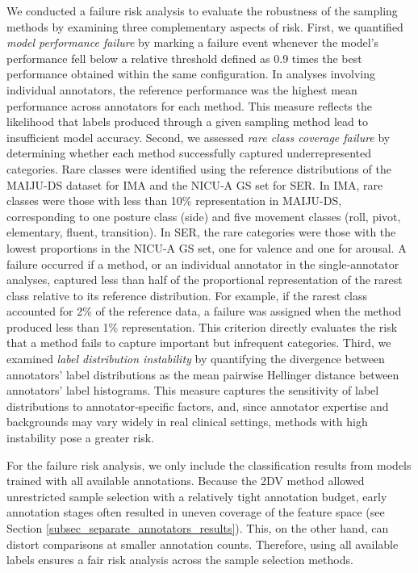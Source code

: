 \documentclass[a4paper,fleqn]{cas-dc}
\begin{document}
We conducted a failure risk analysis to evaluate the robustness of the sampling methods by examining three complementary aspects of risk. First, we quantified \textit{model performance failure} by marking a failure event whenever the model's performance fell below a relative threshold defined as 0.9 times the best performance obtained within the same configuration. In analyses involving individual annotators, the reference performance was the highest mean performance across annotators for each method. This measure reflects the likelihood that labels produced through a given sampling method lead to insufficient model accuracy. Second, we assessed \textit{rare class coverage failure} by determining whether each method successfully captured underrepresented categories. Rare classes were identified using the reference distributions of the MAIJU-DS dataset for IMA and the NICU‑A GS set for SER. In IMA, rare classes were those with less than 10\% representation in MAIJU-DS, corresponding to one posture class (side) and five movement classes (roll, pivot, elementary, fluent, transition). In SER, the rare categories were those with the lowest proportions in the NICU-A GS set, one for valence and one for arousal. A failure occurred if a method, or an individual annotator in the single‑annotator analyses, captured less than half of the proportional representation of the rarest class relative to its reference distribution. For example, if the rarest class accounted for 2\% of the reference data, a failure was assigned when the method produced less than 1\% representation. This criterion directly evaluates the risk that a method fails to capture important but infrequent categories. Third, we examined \textit{label distribution instability} by quantifying the divergence between annotators' label distributions as the mean pairwise Hellinger distance between annotators' label histograms. This measure captures the sensitivity of label distributions to annotator‑specific factors, and, since annotator expertise and backgrounds may vary widely in real clinical settings, methods with high instability pose a greater risk.

For the failure risk analysis, we only include the classification results from models trained with all available annotations. Because the 2DV method allowed unrestricted sample selection with a relatively tight annotation budget, early annotation stages often resulted in uneven coverage of the feature space (see Section \ref{subsec_separate_annotators_results}). This, on the other hand, can distort comparisons at smaller annotation counts. Therefore, using all available labels ensures a fair risk analysis across the sample selection methods.
\end{document}

